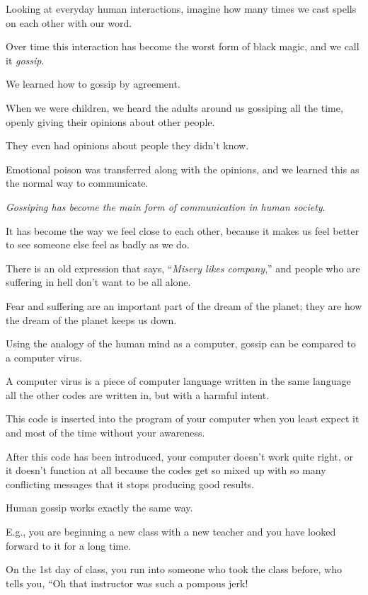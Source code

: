 \documentclass{article}
\numberwithin{equation}{section}
\begin{document}
Looking at everyday human interactions, imagine how many times we cast spells on each other with our word.

Over time this interaction has become the worst form of black magic, and we call it \textit{gossip}.

%

We learned how to gossip by agreement.

When we were children, we heard the adults around us gossiping all the time, openly giving their opinions about other people.

They even had opinions about people they didn't know.

Emotional poison was transferred along with the opinions, and we learned this as the normal way to communicate.

%
\textit{Gossiping has become the main form of communication in human society}.

It has become the way we feel close to each other, because it makes us feel better to see someone else feel as badly as we do.

There is an old expression that says, ``\textit{Misery likes company},'' and people who are suffering in hell don't want to be all alone.

Fear and suffering are an important part of the dream of the planet; they are how the dream of the planet keeps us down.

%
Using the analogy of the human mind as a computer, gossip can be compared to a computer virus.

A computer virus is a piece of computer language written in the same language all the other codes are written in, but with a harmful intent.

This code is inserted into the program of your computer when you least expect it and most of the time without your awareness.

After this code has been introduced, your computer doesn't work quite right, or it doesn't function at all because the codes get so mixed up with so many conflicting messages that it stops producing good results.

%
Human gossip works exactly the same way.

E.g., you are beginning a new class with a new teacher and you have looked forward to it for a long time.

On the 1st day of class, you run into someone who took the class before, who tells you, ``Oh that instructor was such a pompous jerk!
\end{document}
